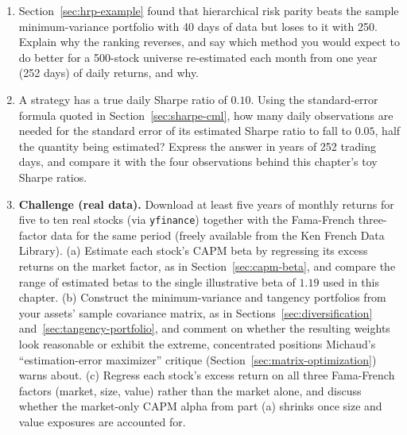 \documentclass[../ai_in_finance]{subfiles}
\begin{document}
\begin{enumerate}[exercises]
    \item Section~\ref{sec:hrp-example} found that hierarchical risk parity beats the sample minimum-variance portfolio with 40 days of data but loses to it with 250. Explain why the ranking reverses, and say which method you would expect to do better for a 500-stock universe re-estimated each month from one year (252 days) of daily returns, and why.
    \item A strategy has a true daily Sharpe ratio of $0.10$. Using the standard-error formula quoted in Section~\ref{sec:sharpe-cml}, how many daily observations are needed for the standard error of its estimated Sharpe ratio to fall to $0.05$, half the quantity being estimated? Express the answer in years of 252 trading days, and compare it with the four observations behind this chapter's toy Sharpe ratios.
    \item \textbf{Challenge (real data).} Download at least five years of monthly returns for five to ten real stocks (via \texttt{yfinance}) together with the Fama-French three-factor data for the same period (freely available from the Ken French Data Library). (a) Estimate each stock's CAPM beta by regressing its excess returns on the market factor, as in Section~\ref{sec:capm-beta}, and compare the range of estimated betas to the single illustrative beta of $1.19$ used in this chapter. (b) Construct the minimum-variance and tangency portfolios from your assets' sample covariance matrix, as in Sections~\ref{sec:diversification} and~\ref{sec:tangency-portfolio}, and comment on whether the resulting weights look reasonable or exhibit the extreme, concentrated positions Michaud's ``estimation-error maximizer'' critique (Section~\ref{sec:matrix-optimization}) warns about. (c) Regress each stock's excess return on all three Fama-French factors (market, size, value) rather than the market alone, and discuss whether the market-only CAPM alpha from part (a) shrinks once size and value exposures are accounted for.
\end{enumerate}

\end{document}
